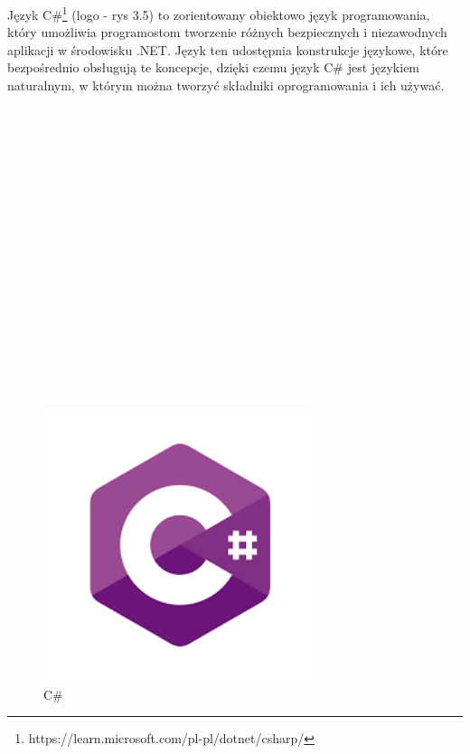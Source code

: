 Język C\#\footnote{ https://learn.microsoft.com/pl-pl/dotnet/csharp/\cite{www5}} (logo - rys 3.5) to zorientowany obiektowo język programowania, który umożliwia programostom tworzenie różnych bezpiecznych i niezawodnych aplikacji w środowisku .NET. Język ten udostępnia konstrukcje językowe, które bezpośrednio obsługują te koncepcje, dzięki czemu język C\# jest językiem naturalnym, w którym można tworzyć składniki oprogramowania i ich używać.
\\
\\
\\
\\
\\
\\
\\
\\
\\
\\
\\
\\
\\
\\
\\
\\
\\
\\
	\begin{figure}[!htb]
	\begin{center}
		\includegraphics[width=8cm]{rys/c.png}
		\caption{C\#}
		\label{rys:rysunek001}
	\end{center}
\end{figure}
